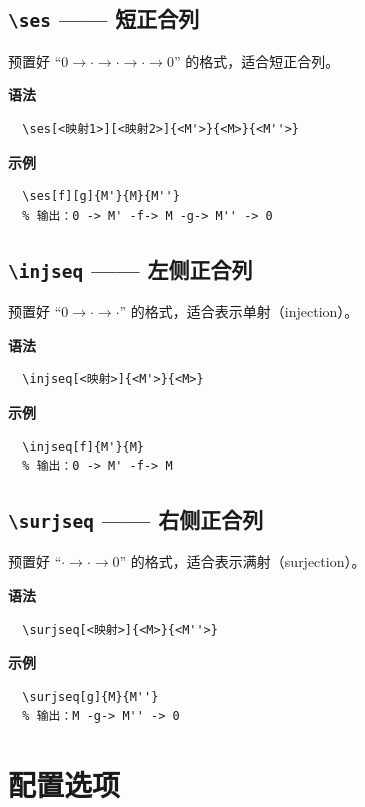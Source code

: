 \documentclass[fontset=fandol]{ctexart}
\newcommand{\cmd}[1]{\texttt{\textbackslash #1}}
\begin{document}
\subsection{\cmd{ses} —— 短正合列}

预置好 ``$0 \to \cdot \to \cdot \to \cdot \to 0$'' 的格式，适合短正合列。

\medskip
\textbf{语法}
\begin{lstlisting}
  \ses[<映射1>][<映射2>]{<M'>}{<M>}{<M''>}
\end{lstlisting}

\medskip
\textbf{示例}
\begin{lstlisting}
  \ses[f][g]{M'}{M}{M''}
  % 输出：0 -> M' -f-> M -g-> M'' -> 0
\end{lstlisting}

\subsection{\cmd{injseq} —— 左侧正合列}

预置好 ``$0 \to \cdot \to \cdot$'' 的格式，适合表示单射（injection）。

\medskip
\textbf{语法}
\begin{lstlisting}
  \injseq[<映射>]{<M'>}{<M>}
\end{lstlisting}

\medskip
\textbf{示例}
\begin{lstlisting}
  \injseq[f]{M'}{M}
  % 输出：0 -> M' -f-> M
\end{lstlisting}

\subsection{\cmd{surjseq} —— 右侧正合列}

预置好 ``$\cdot \to \cdot \to 0$'' 的格式，适合表示满射（surjection）。

\medskip
\textbf{语法}
\begin{lstlisting}
  \surjseq[<映射>]{<M>}{<M''>}
\end{lstlisting}

\medskip
\textbf{示例}
\begin{lstlisting}
  \surjseq[g]{M}{M''}
  % 输出：M -g-> M'' -> 0
\end{lstlisting}

\section{配置选项}
\end{document}
